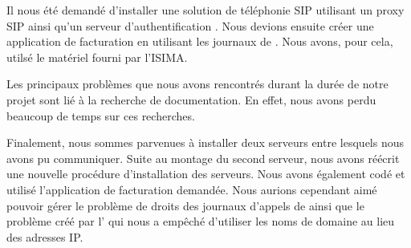 
Il nous été demandé d'installer une solution de téléphonie SIP utilisant un proxy SIP {\kam} ainsi qu'un serveur d'authentification {\rad} {\frad}. Nous devions ensuite créer une application de facturation en utilisant les journaux de {\frad}. Nous avons, pour cela, utilsé le matériel fourni par l'ISIMA.  

Les principaux problèmes que nous avons rencontrés durant la durée de notre projet sont lié à la recherche de documentation. En effet, nous avons perdu beaucoup de temps sur ces recherches. 

Finalement, nous sommes parvenues à installer deux serveurs entre lesquels nous avons pu communiquer. Suite au montage du second serveur, nous avons réécrit une nouvelle procédure d'installation des serveurs.  
Nous avons également codé et utilisé l'application de facturation demandée.
Nous aurions cependant aimé pouvoir gérer le problème de droits des journaux d'appels de {\frad} ainsi que le problème créé par l'{\ata} qui nous a empêché d'utiliser les noms de domaine au lieu des adresses IP.

